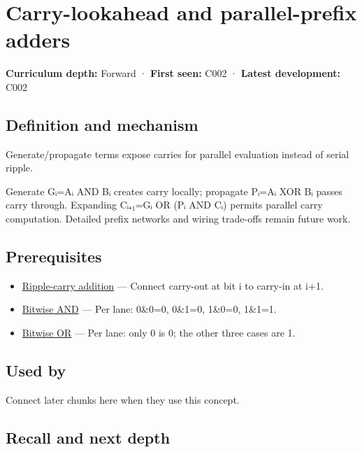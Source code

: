 \hypertarget{appendix-b5c46b2d94ff}{}
\section{Carry-lookahead and parallel-prefix adders}\label{appendix-b5c46b2d94ff-carry-lookahead-and-parallel-prefix-adders}

\textbf{Curriculum depth:} Forward · \textbf{First seen:} C002 · \textbf{Latest development:} C002

\subsection{Definition and mechanism}\label{appendix-b5c46b2d94ff-definition-and-mechanism}

Generate/propagate terms expose carries for parallel evaluation instead of serial ripple.

Generate Gᵢ=Aᵢ AND Bᵢ creates carry locally; propagate Pᵢ=Aᵢ XOR Bᵢ passes carry through. Expanding Cᵢ₊₁=Gᵢ OR (Pᵢ AND Cᵢ) permits parallel carry computation. Detailed prefix networks and wiring trade-offs remain future work.

\subsection{Prerequisites}\label{appendix-b5c46b2d94ff-prerequisites}

\begin{itemize}
\tightlist
\item
  \hyperref[appendix-17917d9fdbe3]{Ripple-carry addition} --- Connect carry-out at bit i to carry-in at i+1.
\item
  \hyperref[appendix-68b52453737c]{Bitwise AND} --- Per lane: 0\&0=0, 0\&1=0, 1\&0=0, 1\&1=1.
\item
  \hyperref[appendix-a427ce8ce8a6]{Bitwise OR} --- Per lane: only 0 is 0; the other three cases are 1.
\end{itemize}

\subsection{Used by}\label{appendix-b5c46b2d94ff-used-by}

Connect later chunks here when they use this concept.

\subsection{Recall and next depth}\label{appendix-b5c46b2d94ff-recall-and-next-depth}

